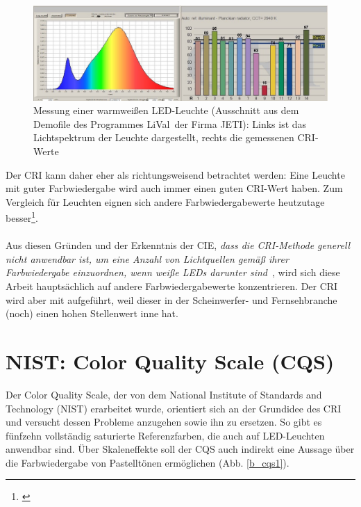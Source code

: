 \begin{figure}[htp]     %
\centering
\includegraphics[width=1.0\textwidth]{bilder/cri2} 
\caption {Messung einer warmweißen LED-Leuchte (Ausschnitt aus dem Demofile des Programmes \glqq LiVal\grqq\ der Firma JETI): Links ist das Lichtspektrum der Leuchte dargestellt, rechts die gemessenen CRI-Werte  \protect\footnotemark}\label{b_cri2}
\end{figure}
\noindent Der CRI kann daher eher als richtungsweisend betrachtet werden: Eine Leuchte mit guter Farbwiedergabe wird auch immer einen guten CRI-Wert haben. 
Zum Vergleich für Leuchten eignen sich andere Farbwiedergabewerte heutzutage besser\footnote{\cite{production partner}}.\\\\
Aus diesen Gründen und der Erkenntnis der CIE, \emph{\glqq dass die CRI-Methode generell nicht anwendbar ist, um eine Anzahl von Lichtquellen gemäß ihrer Farbwiedergabe einzuordnen, wenn weiße LEDs darunter sind\grqq}\ \citep[VI]{CIE}, wird sich diese Arbeit hauptsächlich auf andere Farbwiedergabewerte konzentrieren. Der CRI wird aber mit aufgeführt, weil dieser in der Scheinwerfer- und Fernsehbranche (noch) einen hohen Stellenwert inne hat.



\section{NIST: Color Quality Scale (CQS)} \label{sec_cqs}

Der Color Quality Scale, der von dem National Institute of Standards and Technology (NIST) erarbeitet wurde, orientiert sich an der Grundidee des CRI und versucht dessen Probleme anzugehen sowie ihn zu ersetzen. So gibt es fünfzehn vollständig saturierte Referenzfarben, die auch auf LED-Leuchten anwendbar sind. Über Skaleneffekte soll der CQS auch indirekt eine Aussage über die Farbwiedergabe von Pastelltönen ermöglichen (Abb. \ref{b_cqs1}). 

